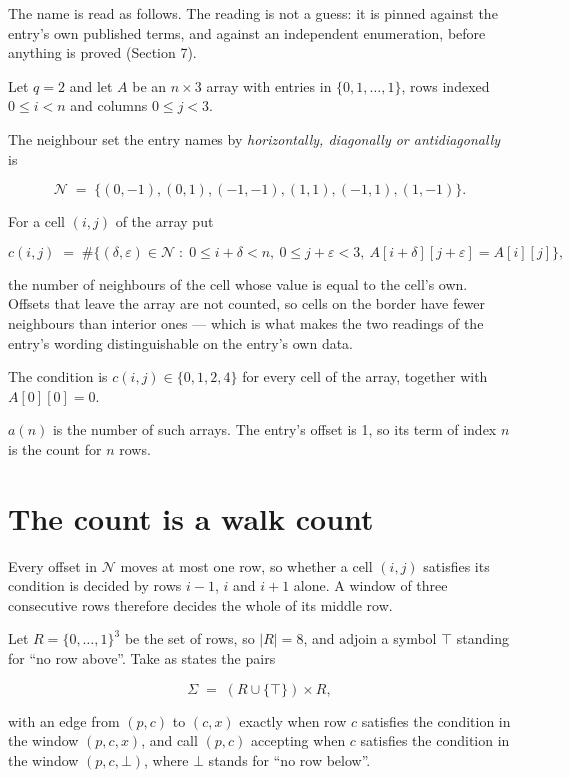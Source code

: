 \documentclass[11pt]{article}
\theoremstyle{definition}
\begin{document}
The name is read as follows. The reading is not a guess: it is pinned against the entry's own published terms, and against an independent enumeration, before anything is proved (Section 7).

Let $q = 2$ and let $A$ be an $n \times 3$ array with entries in $\{0,1,\dots,1\}$, rows indexed $0 \le i < n$ and columns $0 \le j < 3$.

The neighbour set the entry names by {\itshape horizontally, diagonally or antidiagonally} is

\[\mathcal{N} \;=\; \{(0,-1), (0,1), (-1,-1), (1,1), (-1,1), (1,-1)\}.\]

For a cell $(i,j)$ of the array put

\[c(i,j) \;=\; \#\bigl\{(\delta,\varepsilon)\in\mathcal{N} \;:\; 0\le i+\delta<n,\ 0\le j+\varepsilon<3,\ A[i+\delta][j+\varepsilon] = A[i][j]\bigr\},\]

the number of neighbours of the cell whose value is equal to the cell's own. Offsets that leave the array are not counted, so cells on the border have fewer neighbours than interior ones --- which is what makes the two readings of the entry's wording distinguishable on the entry's own data.

The condition is $c(i,j) \in \{0, 1, 2, 4\}$ for every cell of the array, together with $A[0][0]=0$.

$a(n)$ is the number of such arrays. The entry's offset is 1, so its term of index $n$ is the count for $n$ rows.

\section{The count is a walk count}

Every offset in $\mathcal{N}$ moves at most one row, so whether a cell $(i,j)$ satisfies its condition is decided by rows $i-1$, $i$ and $i+1$ alone. A window of three consecutive rows therefore decides the whole of its middle row.

Let $R = \{0,\dots,1\}^{3}$ be the set of rows, so $|R| = 8$, and adjoin a symbol $\top$ standing for ``no row above''. Take as states the pairs

\[\Sigma \;=\; (R \cup \{\top\}) \times R,\]

with an edge from $(p,c)$ to $(c,x)$ exactly when row $c$ satisfies the condition in the window $(p,c,x)$, and call $(p,c)$ accepting when $c$ satisfies the condition in the window $(p,c,\bot)$, where $\bot$ stands for ``no row below''.
\end{document}
